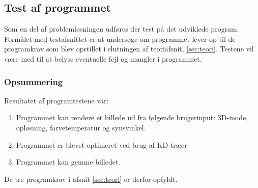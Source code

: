 \subsection{Test af programmet}
\label{sec:test}

Som en del af problemløsningen udføres der test på det udviklede program. Formålet med testafsnittet er at undersøge om programmet lever op til de programkrav som blev opstillet i slutningen af teoriafsnit, \ref{sec:teori}. Testene vil være med til at belyse eventuelle fejl og mangler i programmet.





\subsubsection*{Opsummering}
Resultatet af programtestene var:

\begin{enumerate}
    \item Programmet kan rendere et billede ud fra følgende brugerinput: 3D-mode, opløsning, farvetemperatur og synsvinkel.
    \item Programmet er blevet optimeret ved brug af KD-træer
    \item Programmet kan gemme billedet.
\end{enumerate}

De tre programkrav i afsnit \ref{sec:teori} er derfor opfyldt.
